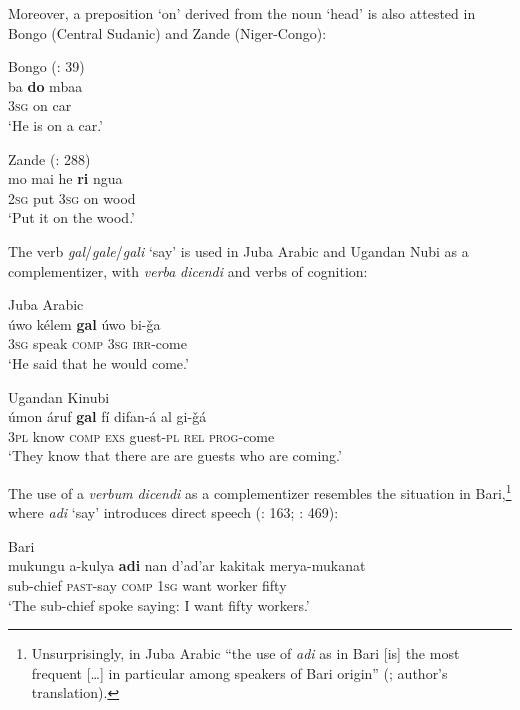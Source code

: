 \documentclass[output=paper]{langsci/langscibook}
\begin{document}
Moreover, a preposition ‘on’ derived from the noun ‘head’ is also attested in Bongo (Central Sudanic) and Zande (Niger-Congo):

\ea
{Bongo (\citealt{Moietal2014}: 39)}\\
\gll            ba \textbf{do} mbaa\\
                3\textsc{sg} on car\\
\glt     `He is on a car.'
\z

\ea
{Zande (\citealt{DeAngelis2002}: 288)}\\
\gll            mo mai he \textbf{ri} ngua\\
                2\textsc{sg} put 3\textsc{sg} on wood\\
\glt     `Put it on the wood.'
\z

The verb \textit{gal}/\textit{gale}/\textit{gali} ‘say’ is used in Juba Arabic and Ugandan Nubi as a complementizer, with \textit{verba} \textit{dicendi} and verbs of cognition:

\ea
\ea Juba Arabic \citep[469]{Miller2001}\\
\gll     úwo kélem \textbf{gal} úwo bi-ǧa\\
         3\textsc{sg} speak \textsc{comp} 3\textsc{sg} \textsc{irr}-come\\
\glt       `He said that he would come.'

\ex
Ugandan Kinubi \citep[204]{Wellens2003}\\
\gll     úmon áruf \textbf{gal} fí difan-á al gi-ǧá\\
         3\textsc{pl} know \textsc{comp} \textsc{exs} guest-\textsc{pl} \textsc{rel} \textsc{prog}-come\\
\glt    `They know that there are are guests who are coming.' 
\z
\z

The use of a \textit{verbum} \textit{dicendi} as a complementizer resembles the situation in Bari,\footnote{Unsurprisingly, in Juba Arabic “the use of \textit{adi} as in Bari [is] the most frequent […] in particular among speakers of Bari origin” (\citealt[470]{Miller2001}; author's translation).} where \textit{adi} ‘say’ introduces direct speech (\citealt{Owens1997}: 163; \citealt{Miller2001}: 469): 

\ea

{Bari \citep[469]{Miller2001}}\\
\gll    mukungu a-kulya \textbf{adi} nan d'ad'ar kakitak merya-mukanat\\
                sub-chief \textsc{past}-say \textsc{comp} 1\textsc{sg} want worker fifty\\
\glt     `The sub-chief spoke saying: I want fifty workers.'
\z
\end{document}
